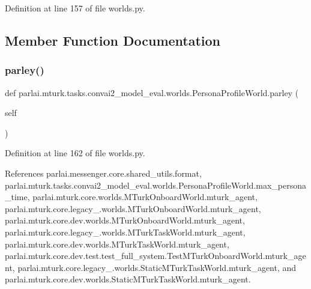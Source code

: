 Definition at line 157 of file worlds.\+py.



\subsection{Member Function Documentation}
\mbox{\label{classparlai_1_1mturk_1_1tasks_1_1convai2__model__eval_1_1worlds_1_1PersonaProfileWorld_a739d128400ec5208820aec46d0b33492}} 
\subsubsection{\texorpdfstring{parley()}{parley()}}
{\footnotesize\ttfamily def parlai.\+mturk.\+tasks.\+convai2\+\_\+model\+\_\+eval.\+worlds.\+Persona\+Profile\+World.\+parley (\begin{DoxyParamCaption}\item[{}]{self }\end{DoxyParamCaption})}



Definition at line 162 of file worlds.\+py.



References parlai.\+messenger.\+core.\+shared\+\_\+utils.\+format, parlai.\+mturk.\+tasks.\+convai2\+\_\+model\+\_\+eval.\+worlds.\+Persona\+Profile\+World.\+max\+\_\+persona\+\_\+time, parlai.\+mturk.\+core.\+worlds.\+M\+Turk\+Onboard\+World.\+mturk\+\_\+agent, parlai.\+mturk.\+core.\+legacy\+\_.\+worlds.\+M\+Turk\+Onboard\+World.\+mturk\+\_\+agent, parlai.\+mturk.\+core.\+dev.\+worlds.\+M\+Turk\+Onboard\+World.\+mturk\+\_\+agent, parlai.\+mturk.\+core.\+legacy\+\_.\+worlds.\+M\+Turk\+Task\+World.\+mturk\+\_\+agent, parlai.\+mturk.\+core.\+dev.\+worlds.\+M\+Turk\+Task\+World.\+mturk\+\_\+agent, parlai.\+mturk.\+core.\+dev.\+test.\+test\+\_\+full\+\_\+system.\+Test\+M\+Turk\+Onboard\+World.\+mturk\+\_\+agent, parlai.\+mturk.\+core.\+legacy\+\_.\+worlds.\+Static\+M\+Turk\+Task\+World.\+mturk\+\_\+agent, and parlai.\+mturk.\+core.\+dev.\+worlds.\+Static\+M\+Turk\+Task\+World.\+mturk\+\_\+agent.



